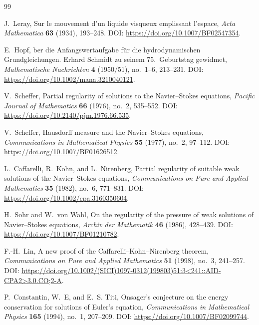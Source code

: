 \documentclass[11pt]{article}
\numberwithin{equation}{section}
\theoremstyle{plain}
\theoremstyle{definition}
\theoremstyle{remark}
\begin{document}
\begin{thebibliography}{99}

J.~Leray,
\newblock Sur le mouvement d'un liquide visqueux emplissant l'espace,
\newblock \emph{Acta Mathematica} \textbf{63} (1934), 193--248.
\newblock DOI: \url{https://doi.org/10.1007/BF02547354}.

E.~Hopf,
ber die Anfangswertaufgabe f{\"u}r die hydrodynamischen Grundgleichungen. Erhard Schmidt zu seinem 75.~Geburtstag gewidmet,
\newblock \emph{Mathematische Nachrichten} \textbf{4} (1950/51), no.~1--6, 213--231.
\newblock DOI: \url{https://doi.org/10.1002/mana.3210040121}.

V.~Scheffer,
\newblock Partial regularity of solutions to the Navier--Stokes equations,
\newblock \emph{Pacific Journal of Mathematics} \textbf{66} (1976), no.~2, 535--552.
\newblock DOI: \url{https://doi.org/10.2140/pjm.1976.66.535}.

V.~Scheffer,
\newblock Hausdorff measure and the Navier--Stokes equations,
\newblock \emph{Communications in Mathematical Physics} \textbf{55} (1977), no.~2, 97--112.
\newblock DOI: \url{https://doi.org/10.1007/BF01626512}.

L.~Caffarelli, R.~Kohn, and L.~Nirenberg,
\newblock Partial regularity of suitable weak solutions of the Navier--Stokes equations,
\newblock \emph{Communications on Pure and Applied Mathematics} \textbf{35} (1982), no.~6, 771--831.
\newblock DOI: \url{https://doi.org/10.1002/cpa.3160350604}.

H.~Sohr and W.~von Wahl,
\newblock On the regularity of the pressure of weak solutions of Navier--Stokes equations,
\newblock \emph{Archiv der Mathematik} \textbf{46} (1986), 428--439.
\newblock DOI: \url{https://doi.org/10.1007/BF01210782}.

F.-H.~Lin,
\newblock A new proof of the Caffarelli--Kohn--Nirenberg theorem,
\newblock \emph{Communications on Pure and Applied Mathematics} \textbf{51} (1998), no.~3, 241--257.
\newblock DOI: \url{https://doi.org/10.1002/(SICI)1097-0312(199803)51:3<241::AID-CPA2>3.0.CO;2-A}.

P.~Constantin, W.~E, and E.~S. Titi,
\newblock Onsager's conjecture on the energy conservation for solutions of Euler's equation,
\newblock \emph{Communications in Mathematical Physics} \textbf{165} (1994), no.~1, 207--209.
\newblock DOI: \url{https://doi.org/10.1007/BF02099744}.


\end{thebibliography}
\end{document}
